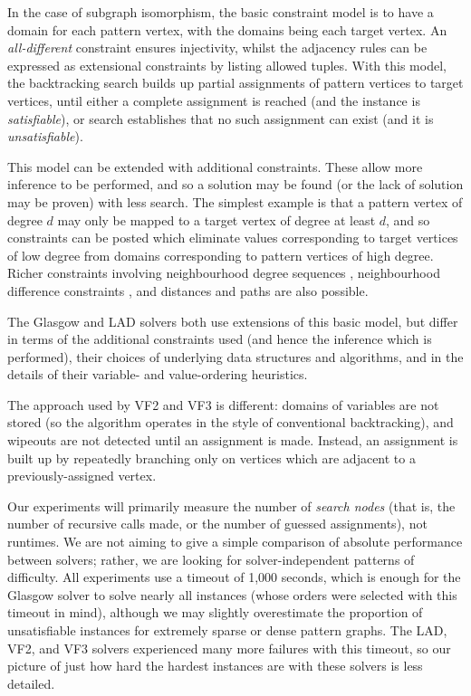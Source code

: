 \documentclass[twoside,11pt]{article}
\newcommand{\citep}[1]{\cite{#1}}
\begin{document}
In the case of subgraph isomorphism, the basic constraint model is to have a domain for each pattern
vertex, with the domains being each target vertex. An \emph{all-different} constraint ensures
injectivity, whilst the adjacency rules can be expressed as extensional constraints by listing
allowed tuples.  With this model, the backtracking search builds up partial assignments of pattern
vertices to target vertices, until either a complete assignment is reached (and the instance is
\emph{satisfiable}), or search establishes that no such assignment can exist (and it is
\emph{unsatisfiable}).

This model can be extended with additional constraints. These allow more inference to be performed,
and so a solution may be found (or the lack of solution may be proven) with less search.  The
simplest example is that a pattern vertex of degree $d$ may only be mapped to a target vertex of
degree at least $d$, and so constraints can be posted which eliminate values corresponding to target
vertices of low degree from domains corresponding to pattern vertices of high degree. Richer
constraints involving neighbourhood degree sequences \citep{DBLP:journals/constraints/ZampelliDS10},
neighbourhood difference constraints \citep{DBLP:journals/ai/Solnon10}, and distances and paths
\citep{DBLP:conf/cp/AudemardLMGP14,DBLP:conf/cp/McCreeshP15,DBLP:conf/lion/KotthoffMS16} are also
possible.

The Glasgow and LAD solvers both use extensions of this basic model, but differ in terms of the
additional constraints used (and hence the inference which is performed), their choices of
underlying data structures and algorithms, and in the details of their variable- and value-ordering
heuristics.

The approach used by VF2 and VF3 is different: domains of variables are not stored (so the algorithm
operates in the style of conventional backtracking), and wipeouts are not detected until an
assignment is made. Instead, an assignment is built up by repeatedly branching only on vertices
which are adjacent to a previously-assigned vertex.

Our experiments will primarily measure the number of \emph{search nodes} (that is, the number of
recursive calls made, or the number of guessed assignments), not runtimes. We are not aiming to give
a simple comparison of absolute performance between solvers; rather, we are looking for
solver-independent patterns of difficulty. All experiments use a timeout of 1,000 seconds, which is
enough for the Glasgow solver to solve nearly all instances (whose orders were selected with this
timeout in mind), although we may slightly overestimate the proportion of unsatisfiable instances
for extremely sparse or dense pattern graphs. The LAD, VF2, and VF3 solvers experienced many more
failures with this timeout, so our picture of just how hard the hardest instances are with these
solvers is less detailed.
\end{document}
